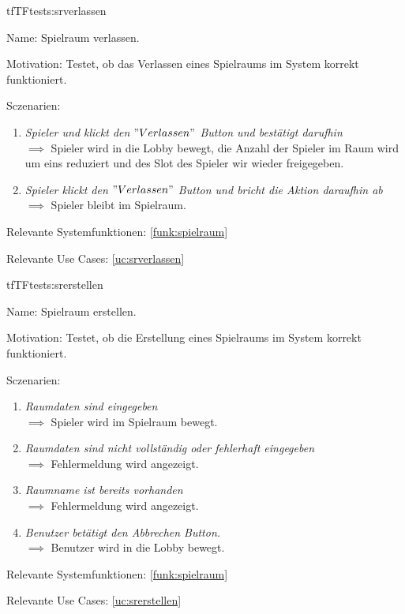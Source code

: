 \begin{description}[leftmargin=5em, style=sameline]
{
\begin{lhp}{tf}{TF}{tests:srverlassen}
	\item [Name:] Spielraum verlassen.
	\item [Motivation:] Testet, ob das Verlassen eines Spielraums im System korrekt funktioniert.
	\item [Sczenarien:] \hfill
		\begin{enumerate}
			\item \textit{Spieler und klickt den $"Verlassen"$ Button und bestätigt darufhin} \\ $\implies$ Spieler wird in die Lobby bewegt, die Anzahl der Spieler im Raum wird um eins reduziert und des Slot des Spieler wir wieder freigegeben.
		
			\item \textit{Spieler klickt den $"Verlassen"$ Button und bricht die Aktion daraufhin ab} \\ $\implies$ Spieler bleibt im Spielraum.
		\end{enumerate}
	\item [Relevante Systemfunktionen:] \ref{funk:spielraum}
	\item [Relevante Use Cases:] \ref{uc:srverlassen}
\end{lhp}
}



{
\begin{lhp}{tf}{TF}{tests:srerstellen}
	\item [Name:] Spielraum erstellen.
	\item [Motivation:] Testet, ob die Erstellung eines Spielraums im System korrekt funktioniert.
	\item [Sczenarien:] \hfill
		\begin{enumerate}
			\item \textit{Raumdaten sind eingegeben} \\ $\implies$ Spieler wird im Spielraum bewegt.
			\item \textit{Raumdaten sind nicht vollständig oder fehlerhaft eingegeben} \\ $\implies$ Fehlermeldung wird angezeigt.
			\item \textit{Raumname ist bereits vorhanden} \\ $\implies$ Fehlermeldung wird angezeigt.
			\item \textit{Benutzer betätigt den Abbrechen Button.} \\ $\implies$ Benutzer wird in die Lobby bewegt.
		\end{enumerate}
	\item [Relevante Systemfunktionen:] \ref{funk:spielraum}
	\item [Relevante Use Cases:] \ref{uc:srerstellen}
\end{lhp}
}


\end{description}
